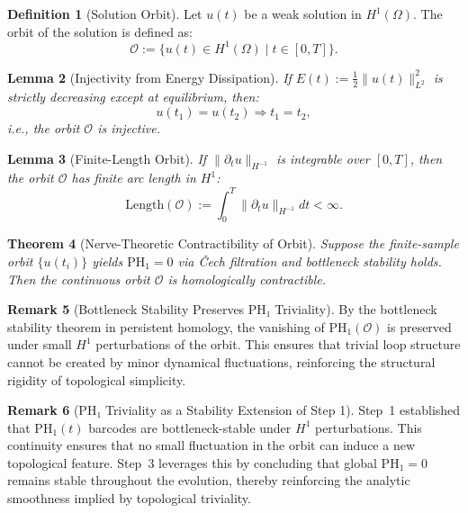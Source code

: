 \documentclass[11pt]{article}
\newtheorem{theorem}{Theorem}[section]
\newtheorem{lemma}[theorem]{Lemma}
\theoremstyle{definition}
\newtheorem{definition}[theorem]{Definition}
\newtheorem{remark}[theorem]{Remark}
\begin{document}
\begin{definition}[Solution Orbit]
Let $u(t)$ be a weak solution in $H^1(\Omega)$. The orbit of the solution is defined as:
\[
\mathcal{O} := \{ u(t) \in H^1(\Omega) \mid t \in [0,T] \}.
\]
\end{definition}

\begin{lemma}[Injectivity from Energy Dissipation]
If $E(t) := \frac{1}{2} \| u(t) \|_{L^2}^2$ is strictly decreasing except at equilibrium, then:
\[
u(t_1) = u(t_2) \Rightarrow t_1 = t_2,
\]
i.e., the orbit $\mathcal{O}$ is injective.
\end{lemma}

\begin{lemma}[Finite-Length Orbit]
If $\| \partial_t u \|_{H^{-1}}$ is integrable over $[0,T]$, then the orbit $\mathcal{O}$ has finite arc length in $H^1$:
\[
\mathrm{Length}(\mathcal{O}) := \int_0^T \| \partial_t u \|_{H^{-1}} dt < \infty.
\]
\end{lemma}

\begin{theorem}[Nerve-Theoretic Contractibility of Orbit]
Suppose the finite-sample orbit $\{u(t_i)\}$ yields $\mathrm{PH}_1 = 0$ via Čech filtration and bottleneck stability holds. Then the continuous orbit $\mathcal{O}$ is homologically contractible.
\end{theorem}

\begin{remark}[Bottleneck Stability Preserves PH₁ Triviality]
By the bottleneck stability theorem in persistent homology, the vanishing of $\mathrm{PH}_1(\mathcal{O})$ is preserved under small $H^1$ perturbations of the orbit. This ensures that trivial loop structure cannot be created by minor dynamical fluctuations, reinforcing the structural rigidity of topological simplicity.
\end{remark}

\begin{remark}[PH₁ Triviality as a Stability Extension of Step 1]
Step~1 established that $\mathrm{PH}_1(t)$ barcodes are bottleneck-stable under $H^1$ perturbations. This continuity ensures that no small fluctuation in the orbit can induce a new topological feature. Step~3 leverages this by concluding that global $\mathrm{PH}_1 = 0$ remains stable throughout the evolution, thereby reinforcing the analytic smoothness implied by topological triviality.
\end{remark}
\end{document}
